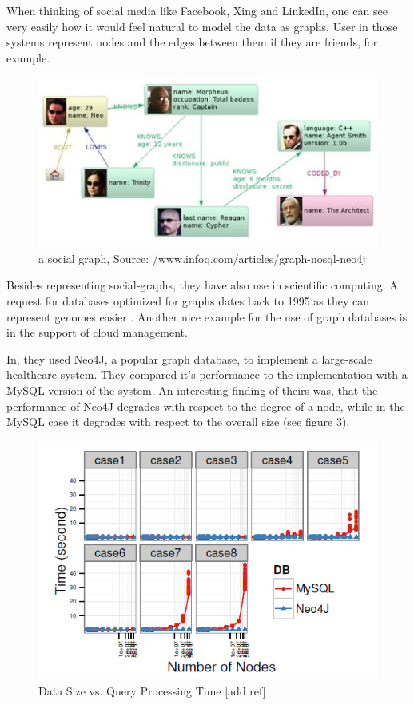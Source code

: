 \documentclass{acm_proc_article-sp}
\begin{document}
When thinking of social media like Facebook, Xing and LinkedIn, one can see very easily how it would feel natural to model the data as graphs. User in those systems represent nodes and the edges between them if they are friends, for example.

\begin{figure}[hbtp]
	\centering
	\includegraphics[scale=0.35]{neo4j.jpg}
	\caption{a social graph, Source: /www.infoq.com/articles/graph-nosql-neo4j}
\end{figure}

Besides representing social-graphs, they have also use in scientific computing. A request for databases optimized for graphs dates back to 1995 as they can represent genomes easier \cite{genome}. Another nice example for the use of graph databases is in the support of cloud management. 

In\cite{healtcare}, they used Neo4J, a popular graph database, to implement a large-scale healthcare system. They compared it's performance to the implementation with a MySQL version of the system. An interesting finding of theirs was, that the performance of Neo4J degrades with respect to the degree of a node, while in the MySQL case it degrades with respect to the overall size (see figure 3).

\begin{figure}[hbtp]
	\centering
	\includegraphics[scale=0.4]{neo4j_mysql.png}
	\caption{Data Size vs. Query Processing Time [add ref]}
\end{figure}
\end{document}
